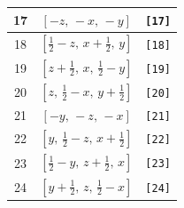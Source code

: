 \documentclass[fleqn,8pt]{jsarticle}
\begin{document}
\begin{longtable}{ccc}
17 & $\left[ - z,\, - x,\, - y \right]$ & {\tt [17]} \\ \hline
18 & $\left[ \frac{1}{2} - z,\, x + \frac{1}{2},\, y \right]$ & {\tt [18]} \\ \hline
19 & $\left[ z + \frac{1}{2},\, x,\, \frac{1}{2} - y \right]$ & {\tt [19]} \\ \hline
20 & $\left[ z,\, \frac{1}{2} - x,\, y + \frac{1}{2} \right]$ & {\tt [20]} \\ \hline
21 & $\left[ - y,\, - z,\, - x \right]$ & {\tt [21]} \\ \hline
22 & $\left[ y,\, \frac{1}{2} - z,\, x + \frac{1}{2} \right]$ & {\tt [22]} \\ \hline
23 & $\left[ \frac{1}{2} - y,\, z + \frac{1}{2},\, x \right]$ & {\tt [23]} \\ \hline
24 & $\left[ y + \frac{1}{2},\, z,\, \frac{1}{2} - x \right]$ & {\tt [24]} \\
\end{longtable}
\end{document}
